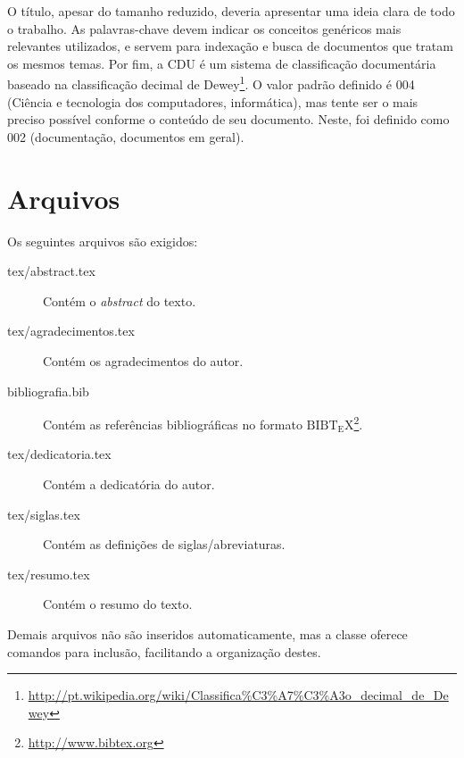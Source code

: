 O título, apesar do tamanho reduzido, deveria apresentar uma ideia clara de todo
o trabalho. As palavras-chave devem indicar os conceitos genéricos mais relevantes
utilizados, e servem para indexação e busca de documentos que tratam os mesmos
temas.  Por fim, a \acrfull{CDU} é um sistema de classificação documentária
baseado na classificação decimal de Dewey\footnote{\url{http://pt.wikipedia.org/wiki/Classifica\%C3\%A7\%C3\%A3o_decimal_de_Dewey}}.
O valor padrão definido é 004 (Ciência e tecnologia dos computadores, informática),
mas tente ser o mais preciso possível conforme o conteúdo de seu documento. Neste,
foi definido como 002 (documentação, documentos em geral).


\section{Arquivos}
Os seguintes arquivos são exigidos:
\begin{description}%
    \item[tex/abstract.tex] Contém o \emph{abstract} do texto.%
    \item[tex/agradecimentos.tex] Contém os agradecimentos do autor.%
    \item[bibliografia.bib] Contém as referências bibliográficas no formato
    ${\mathrm{B{\scriptstyle{IB}}T_{\displaystyle E}X}}$\footnote{\url{http://www.bibtex.org}}.%
    \item[tex/dedicatoria.tex] Contém a dedicatória do autor.%
    \item[tex/siglas.tex] Contém as definições de siglas/abreviaturas.%
    \item[tex/resumo.tex] Contém o resumo do texto.%
\end{description}%

Demais arquivos não são inseridos automaticamente, mas a classe oferece comandos
para inclusão, facilitando a organização destes.



